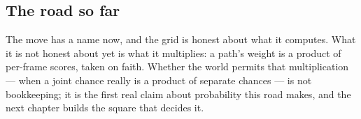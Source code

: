 \cleardoublepage
\begin{narrative}
\section*{The road so far}


\noindent The move has a name now, and the grid is honest about what it computes. What it is not honest about yet is what it multiplies: a path's weight is a product of per-frame scores, taken on faith. Whether the world permits that multiplication — when a joint chance really is a product of separate chances — is not bookkeeping; it is the first real claim about probability this road makes, and the next chapter builds the square that decides it.
\end{narrative}
